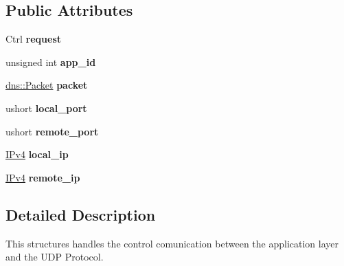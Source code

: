 \subsection*{Public Attributes}
\begin{DoxyCompactItemize}
\item 
Ctrl {\bfseries request}\hypertarget{structudp_1_1Control_a2aa019b350db9c5f2d66f20772d9b79b}{}\label{structudp_1_1Control_a2aa019b350db9c5f2d66f20772d9b79b}

\item 
unsigned int {\bfseries app\+\_\+id}\hypertarget{structudp_1_1Control_af8d12ad139541466d82bd99d79e3be42}{}\label{structudp_1_1Control_af8d12ad139541466d82bd99d79e3be42}

\item 
\hyperlink{structdns_1_1Packet}{dns\+::\+Packet} {\bfseries packet}\hypertarget{structudp_1_1Control_afb69653a07aa874b2c6be07621744c9d}{}\label{structudp_1_1Control_afb69653a07aa874b2c6be07621744c9d}

\item 
ushort {\bfseries local\+\_\+port}\hypertarget{structudp_1_1Control_a4f07eed648f80d37385c12a0b5b803f8}{}\label{structudp_1_1Control_a4f07eed648f80d37385c12a0b5b803f8}

\item 
ushort {\bfseries remote\+\_\+port}\hypertarget{structudp_1_1Control_a03d29c28ed03e44e4db2df155f638b3e}{}\label{structudp_1_1Control_a03d29c28ed03e44e4db2df155f638b3e}

\item 
\hyperlink{structIPv4}{I\+Pv4} {\bfseries local\+\_\+ip}\hypertarget{structudp_1_1Control_a3f31765e13cd17a0c2661754971db196}{}\label{structudp_1_1Control_a3f31765e13cd17a0c2661754971db196}

\item 
\hyperlink{structIPv4}{I\+Pv4} {\bfseries remote\+\_\+ip}\hypertarget{structudp_1_1Control_ae07465d93c71c8ed4a74d8c523c6f054}{}\label{structudp_1_1Control_ae07465d93c71c8ed4a74d8c523c6f054}

\end{DoxyCompactItemize}


\subsection{Detailed Description}
This structures handles the control comunication between the application layer and the U\+DP Protocol. 

